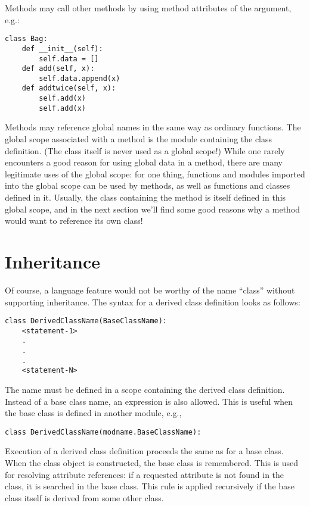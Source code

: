 \documentclass{manual}
\begin{document}
Methods may call other methods by using method attributes of the
 argument, e.g.:

\begin{verbatim}
class Bag:
    def __init__(self):
        self.data = []
    def add(self, x):
        self.data.append(x)
    def addtwice(self, x):
        self.add(x)
        self.add(x)
\end{verbatim}


Methods may reference global names in the same way as ordinary
functions.  The global scope associated with a method is the module
containing the class definition.  (The class itself is never used as a
global scope!)  While one rarely encounters a good reason for using
global data in a method, there are many legitimate uses of the global
scope: for one thing, functions and modules imported into the global
scope can be used by methods, as well as functions and classes defined
in it.  Usually, the class containing the method is itself defined in
this global scope, and in the next section we'll find some good
reasons why a method would want to reference its own class!


\section{Inheritance \label{inheritance}}

Of course, a language feature would not be worthy of the name ``class''
without supporting inheritance.  The syntax for a derived class
definition looks as follows:

\begin{verbatim}
class DerivedClassName(BaseClassName):
    <statement-1>
    .
    .
    .
    <statement-N>
\end{verbatim}

The name  must be defined in a scope containing
the derived class definition.  Instead of a base class name, an
expression is also allowed.  This is useful when the base class is
defined in another module, e.g.,

\begin{verbatim}
class DerivedClassName(modname.BaseClassName):
\end{verbatim}

Execution of a derived class definition proceeds the same as for a
base class.  When the class object is constructed, the base class is
remembered.  This is used for resolving attribute references: if a
requested attribute is not found in the class, it is searched in the
base class.  This rule is applied recursively if the base class itself
is derived from some other class.
\end{document}
